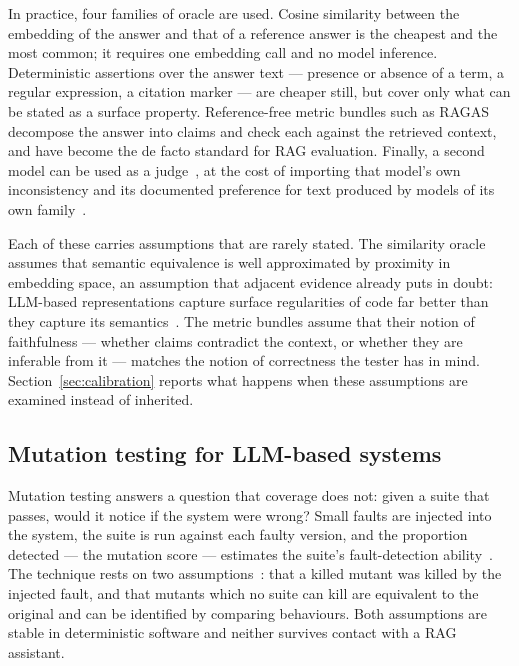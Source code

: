 \documentclass[a4paper,fleqn]{cas-dc}
\begin{document}
In practice, four families of oracle are used. Cosine similarity between the
embedding of the answer and that of a reference answer is the cheapest and the
most common; it requires one embedding call and no model inference.
Deterministic assertions over the answer text --- presence or absence of a
term, a regular expression, a citation marker --- are cheaper still, but cover
only what can be stated as a surface property. Reference-free metric bundles
such as RAGAS~\cite{es2024ragas} decompose the answer into claims and check each
against the retrieved context, and have become the de facto standard for RAG
evaluation. Finally, a second model can be used as a judge~\cite{zheng2023judging},
at the cost of importing that model's own inconsistency and its documented
preference for text produced by models of its own
family~\cite{panickssery2024llm}.

Each of these carries assumptions that are rarely stated. The similarity oracle
assumes that semantic equivalence is well approximated by proximity in
embedding space, an assumption that adjacent evidence already puts in doubt:
LLM-based representations capture surface regularities of code far better than
they capture its semantics~\cite{infsof2025codesemantics}. The metric bundles
assume that their notion of faithfulness --- whether claims contradict the
context, or whether they are inferable from it --- matches the notion of
correctness the tester has in mind. Section~\ref{sec:calibration} reports what
happens when these assumptions are examined instead of inherited.

\subsection{Mutation testing for LLM-based systems}
\label{sec:mutation}

Mutation testing answers a question that coverage does not: given a suite that
passes, would it notice if the system were wrong? Small faults are injected
into the system, the suite is run against each faulty version, and the
proportion detected --- the mutation score --- estimates the suite's
fault-detection ability~\cite{demillo1978hints}. The technique rests on two
assumptions~\cite{jia2011analysis}: that a killed mutant was killed by the
injected fault, and that mutants which no suite can kill are equivalent to the
original and can be identified by comparing behaviours. Both assumptions are
stable in deterministic software and neither survives contact with a RAG
assistant.
\end{document}
